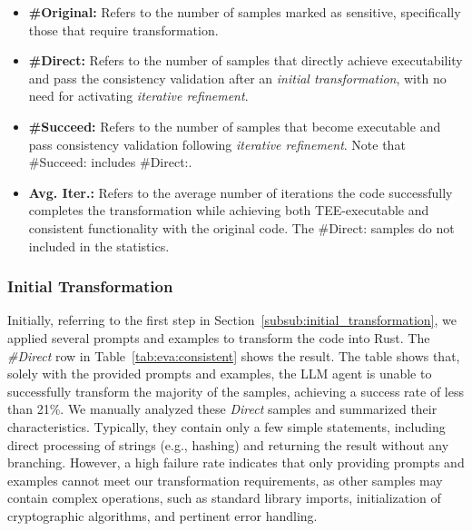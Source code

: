 \begin{itemize}[leftmargin=*]
    \item \textbf{\#Original:} Refers to the number of samples marked as sensitive, specifically those that require transformation.

    \item \textbf{\#Direct:} Refers to the number of samples that directly achieve executability and pass the consistency validation after an \emph{initial transformation}, with no need for activating \emph{iterative refinement}.

    \item \textbf{\#Succeed:} Refers to the number of samples that become executable and pass consistency validation following \emph{iterative refinement}.
    Note that {\#Succeed:} includes {\#Direct:}.

    \item \textbf{Avg. Iter.:} Refers to the average number of iterations the code successfully completes the transformation while achieving both TEE-executable and consistent functionality with the original code. 
    The {\#Direct:} samples do not included in the statistics.

\end{itemize}

\subsubsection{Initial Transformation}
Initially, referring to the first step in Section~\ref{subsub:initial_transformation}, we applied several prompts and examples to transform the code into Rust.
The \textit{\#Direct} row in Table~\ref{tab:eva:consistent} shows the result.
The table shows that, solely with the provided prompts and examples, the LLM agent is unable to successfully transform the majority of the samples, achieving a success rate of less than 21\%.
We manually analyzed these \emph{Direct} samples and summarized their characteristics.
Typically, they contain only a few simple statements, including direct processing of strings (e.g., hashing) and returning the result without any branching.
However, a high failure rate indicates that only providing prompts and examples cannot meet our transformation requirements, as other samples may contain complex operations, such as standard library imports, initialization of cryptographic algorithms, and pertinent error handling.

